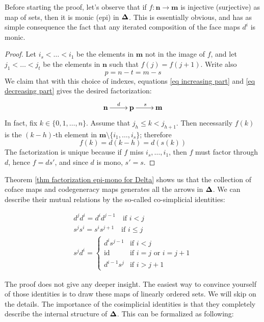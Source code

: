 \begin{rmk}
Before starting the proof, let's observe that if $f \colon \mathbf n \to \mathbf m$ is injective (surjective) as map of sets, then it is monic (epi) in $\mathbf \Delta$. This is essentially obvious, and has as simple consequence the fact that any iterated composition of the face maps $d^i$ is monic.
\end{rmk}

\begin{proof}
Let $i_s < \ldots < i_1$ be the elements in $\mathbf m$ not in the image of $f$, and let $j_1 < \ldots < j_t$ be the elements in $\mathbf n$ such that $f(j) = f(j+1)$. Write also
\[
p = n -t = m - s
\]
We claim that with this choice of indexes, equations \eqref{eq increasing part} and \eqref{eq decreasing part} gives the desired factorization:
\[
\xymatrix{ \mathbf n \ar[r]^d & \mathbf p \ar[r]^s & \mathbf m }
\]
In fact, fix $k \in \{0,1,\ldots,n\}$. Assume that $j_h \le k < j_{h+1}$. Then necessarily $f(k)$ is the $(k-h)$-th element in $\mathbf m \setminus \{i_1,\ldots,i_s\}$; therefore
\[
f(k) = d(k-h) = d(s(k))
\]
The factorization is unique because if $f$ miss $i_s,\ldots,i_1$, then $f$ must factor through $d$, hence $f = d s'$, and since $d$ is mono, $s' = s$.
\end{proof}

Theorem \ref{thm factorization epi-mono for Delta} shows us that the collection of coface maps and codegeneracy maps generates all the arrows in $\mathbf \Delta$. We can describe their mutual relations by the so-called co-simplicial identities:

\begin{equation} \label{eq cosimplicial identities}
\begin{gathered}
d^j d^i = d^i d^{j-1} \quad \text{if } i < j \\
s^j s^i = s^i s^{j+1} \quad \text{if } i \le j \\
s^j d^i = \begin{cases} d^i s^{j-1} & \text{if } i < j \\
\text{id} & \text{if } i = j \text{ or } i = j + 1 \\
d^{i-1} s^j & \text{if } i > j+1 \end{cases}
\end{gathered}
\end{equation}

The proof does not give any deeper insight. The easiest way to convince yourself of those identities is to draw these maps of linearly ordered sets. We will skip on the details. The importance of the cosimplicial identities is that they completely describe the internal structure of $\mathbf \Delta$. This can be formalized as following:


